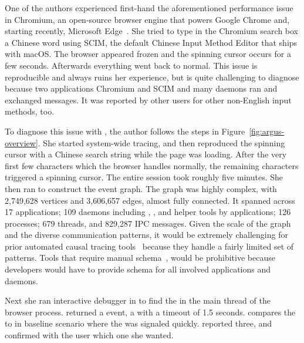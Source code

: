 One of the authors experienced first-hand the aforementioned performance issue
in Chromium, an open-source browser engine that powers Google Chrome and,
starting recently, Microsoft Edge~\cite{chromiumurl}. She tried to type in the
Chromium search box a Chinese word using SCIM, the default Chinese Input Method
Editor that ships with macOS. The browser appeared frozen and the spinning
cursor occurs for a few seconds. Afterwards everything went back to normal.
This issue is reproducible and always ruins her experience, but is quite
challenging to diagnose because two applications Chromium and SCIM and many
daemons ran and exchanged messages. It was reported by other users for
other non-English input methods, too.


To diagnose this issue with \xxx, the author follows the steps in
Figure~\ref{fig:argus-overview}. She started system-wide tracing, and then
reproduced the spinning cursor with a Chinese search string while the page was
loading. After the very first few characters which the browser handles normally,
the remaining characters triggered a spinning cursor. The entire session took roughly
five minutes.
She then ran \xxx to construct the event graph. The graph was highly complex,
with 2,749,628 vertices and 3,606,657 edges, almost fully connected. It spanned
across 17 applications; 109 daemons including , ,
 and helper tools by applications; 126 processes; 679
threads, and 829,287 IPC messages. Given the scale of the graph and the diverse
communication patterns, it would be extremely challenging for prior automated
causal tracing tools~\cite{aguilera2003performance, zhang2013panappticon,
attariyan2012x, cohen2004correlating} because they handle a fairly limited
set of patterns. Tools that require manual schema~\cite{barham2004using,
reynolds2006pip}, would be prohibitive because developers would have to provide
schema for all involved applications and daemons.

Next she ran interactive debugger in \xxx to find the \spinningnode in the main
thread of the browser process. \xxx returned a  event, a 
with a timeout of 1.5 seconds.  
\xxx
compares the \spinningnode to \similarnode in baseline scenario where the 
was signaled quickly. \xxx reported three, and confirmed with the user which one
she wanted.


